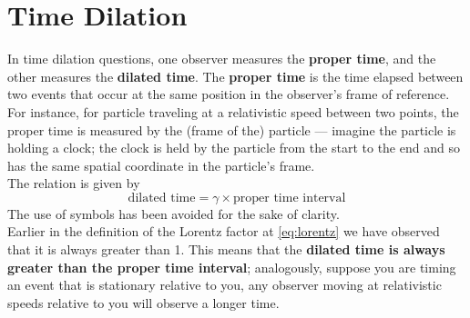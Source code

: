 \documentclass[a4paper,12pt]{article}
\let\oldsection\section
\renewcommand\section{\clearpage\oldsection}
\newcommand{\lb}{\\[8pt]}
\begin{document}
\section{Time Dilation}

In time dilation questions, one observer measures the \textbf{proper time}, and the other measures the \textbf{dilated time}. The \textbf{proper time} is the time elapsed between two events that occur at the same position in the observer's frame of reference. For instance, for particle traveling at a relativistic speed between two points, the proper time is measured by the (frame of the) particle --- imagine the particle is holding a clock; the clock is held by the particle from the start to the end and so has the same spatial coordinate in the particle's frame.\lb
The relation is given by
\begin{equation}
  \text{dilated time} = \gamma \times \text{proper time interval}
\end{equation}
The use of symbols has been avoided for the sake of clarity.\lb
Earlier in the definition of the Lorentz factor at \cref{eq:lorentz} we have observed that it is always greater than 1. This means that the \textbf{dilated time is always greater than the proper time interval}; analogously, suppose you are timing an event that is stationary relative to you, any observer moving at relativistic speeds relative to you will observe a longer time.\pagebreak
\end{document}
